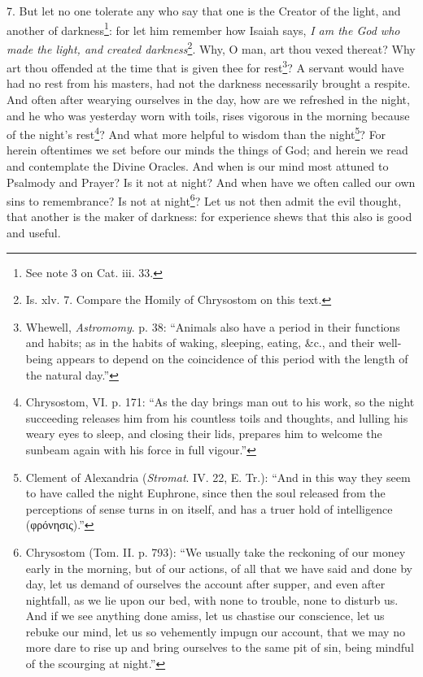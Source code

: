 7. But let no one tolerate any who say that one is the Creator of the light, and another of darkness\footnote{See note 3 on Cat. iii. 33.}: for let him remember how Isaiah says, \emph{I am the God who made the light, and created darkness}\footnote{Is. xlv. 7. Compare the Homily of Chrysostom on this text.}. Why, O man, art thou vexed thereat? Why art thou offended at the time that is given thee for rest\footnote{Whewell, \emph{Astromomy}. p. 38: “Animals also have a period in their functions and habits; as in the habits of waking, sleeping, eating, \&c., and their well-being appears to depend on the coincidence of this period with the length of the natural day.”}? A servant would have had no rest from his masters, had not the darkness necessarily brought a respite. And often after wearying ourselves in the day, how are we refreshed in the night, and he who was yesterday worn with toils, rises vigorous in the morning because of the night’s rest\footnote{Chrysostom, VI. p. 171: “As the day brings man out to his work, so the night succeeding releases him from his countless toils and thoughts, and lulling his weary eyes to sleep, and closing their lids, prepares him to welcome the sunbeam again with his force in full vigour.”}? And what more helpful to wisdom than the night\footnote{Clement of Alexandria (\emph{Stromat}. IV. 22, E. Tr.): “And in this way they seem to have called the night Euphrone, since then the soul released from the perceptions of sense turns in on itself, and has a truer hold of intelligence (\textgreek{φρόνησις}).”}? For herein oftentimes we set before our minds the things of God; and herein we read and contemplate the Divine Oracles. And when is our mind most attuned to Psalmody and Prayer? Is it not at night? And when have we often called our own sins to remembrance? Is not at night\footnote{Chrysostom (Tom. II. p. 793): “We usually take the reckoning of our money early in the morning, but of our actions, of all that we have said and done by day, let us demand of ourselves the account after supper, and even after nightfall, as we lie upon our bed, with none to trouble, none to disturb us. And if we see anything done amiss, let us chastise our conscience, let us rebuke our mind, let us so vehemently impugn our account, that we may no more dare to rise up and bring ourselves to the same pit of sin, being mindful of the scourging at night.”}? Let us not then admit the evil thought, that another is the maker of darkness: for experience shews that this also is good and useful.

